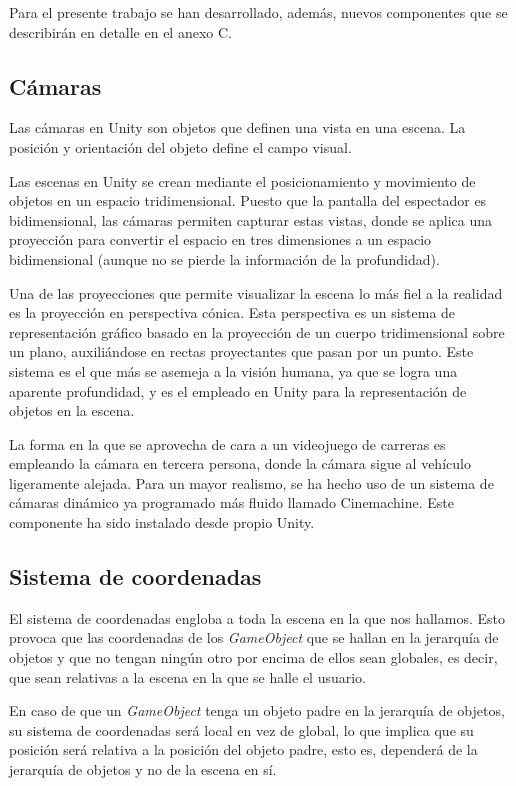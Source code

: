 Para el presente trabajo se han desarrollado, además, nuevos componentes que se describirán en detalle en el anexo C.

\subsection{Cámaras}

Las cámaras en Unity son objetos que definen una vista en una escena. La posición y orientación del objeto define el campo visual.

Las escenas en Unity se crean mediante el posicionamiento y movimiento de objetos en un espacio tridimensional. Puesto que la pantalla del espectador es bidimensional, las cámaras permiten capturar estas vistas, donde se aplica una proyección para convertir el espacio en tres dimensiones a un espacio bidimensional (aunque no se pierde la información de la profundidad).

Una de las proyecciones que permite visualizar la escena lo más fiel a la realidad es la proyección en perspectiva cónica. Esta perspectiva es un sistema de representación gráfico basado en la proyección de un cuerpo tridimensional sobre un plano, auxiliándose en rectas proyectantes que pasan por un punto. Este sistema es el que más se asemeja a la visión humana, ya que se logra una aparente profundidad, y es el empleado en Unity para la representación de objetos en la escena.

La forma en la que se aprovecha de cara a un videojuego de carreras es empleando la cámara en tercera persona, donde la cámara sigue al vehículo ligeramente alejada. Para un mayor realismo, se ha hecho uso de un sistema de cámaras dinámico ya programado más fluido llamado Cinemachine. Este componente ha sido instalado desde propio Unity.

\subsection{Sistema de coordenadas}

El sistema de coordenadas engloba a toda la escena en la que nos hallamos. Esto provoca que las coordenadas de los \textit{GameObject} que se hallan en la jerarquía de objetos y que no tengan ningún otro por encima de ellos sean globales, es decir, que sean relativas a la escena en la que se halle el usuario. 

En caso de que un \textit{GameObject} tenga un objeto padre en la jerarquía de objetos, su sistema de coordenadas será local en vez de global, lo que implica que su posición será relativa a la posición del objeto padre, esto es, dependerá de la jerarquía de objetos y no de la escena en sí.

